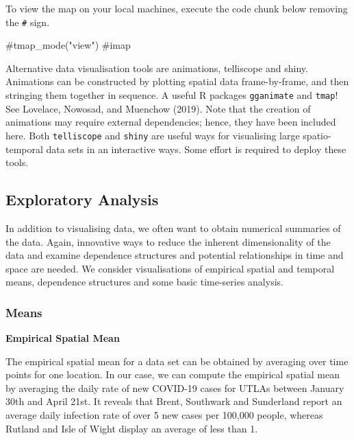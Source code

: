 \documentclass[
  letterpaper,
  DIV=11,
  numbers=noendperiod,
  oneside]{scrreprt}
\newenvironment{Shaded}{\begin{snugshade}}{\end{snugshade}}
\newcommand{\CommentTok}[1]{\textcolor[rgb]{0.37,0.37,0.37}{#1}}
\begin{document}
To view the map on your local machines, execute the code chunk below
removing the \texttt{\#} sign.

\begin{Shaded}
\begin{Highlighting}[]
\CommentTok{\#tmap\_mode("view")}
\CommentTok{\#imap}
\end{Highlighting}
\end{Shaded}

Alternative data visualisation tools are animations, telliscope and
shiny. Animations can be constructed by plotting spatial data
frame-by-frame, and then stringing them together in sequence. A useful R
packages \texttt{gganimate} and \texttt{tmap}! See Lovelace, Nowosad,
and Muenchow (2019). Note that the creation of animations may require
external dependencies; hence, they have been included here. Both
\texttt{telliscope} and \texttt{shiny} are useful ways for visualising
large spatio-temporal data sets in an interactive ways. Some effort is
required to deploy these tools.

\subsection{Exploratory Analysis}\label{exploratory-analysis-1}

In addition to visualising data, we often want to obtain numerical
summaries of the data. Again, innovative ways to reduce the inherent
dimensionality of the data and examine dependence structures and
potential relationships in time and space are needed. We consider
visualisations of empirical spatial and temporal means, dependence
structures and some basic time-series analysis.

\subsubsection{Means}\label{means}

\textbf{Empirical Spatial Mean}

The empirical spatial mean for a data set can be obtained by averaging
over time points for one location. In our case, we can compute the
empirical spatial mean by averaging the daily rate of new COVID-19 cases
for UTLAs between January 30th and April 21st. It reveals that Brent,
Southwark and Sunderland report an average daily infection rate of over
5 new cases per 100,000 people, whereas Rutland and Isle of Wight
display an average of less than 1.
\end{document}
